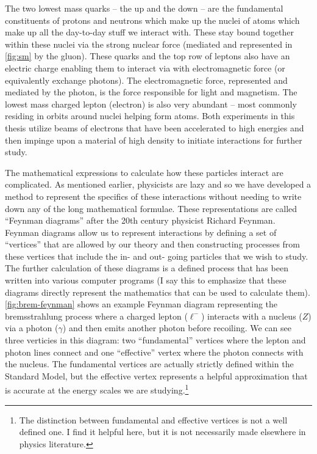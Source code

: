 The two lowest mass quarks -- the up and the down -- are the fundamental constituents of protons
and neutrons which make up the nuclei of atoms which make up all the day-to-day stuff we interact
with. These stay bound together within these nuclei via the strong nuclear force (mediated and
represented in \cref{fig:sm} by the gluon). These quarks and the top row of leptons also have an
electric charge enabling them to interact via with electromagnetic force (or equivalently exchange
photons). The electromagnetic force, represented and mediated by the photon, is the force
responsible for light and magnetism. The lowest mass charged lepton (electron) is also very
abundant -- most commonly residing in orbits around nuclei helping form atoms. Both experiments in
this thesis utilize beams of electrons that have been accelerated to high energies and then
impinge upon a material of high density to initiate interactions for further study.

The mathematical expressions to calculate how these particles interact are complicated. As
mentioned earlier, physicists are lazy and so we have developed a method to represent the specifics
of these interactions without needing to write down any of the long mathematical formulae. These
representations are called ``Feynman diagrams'' after the 20th century physicist Richard Feynman.
Feynman diagrams allow us to represent interactions by defining a set of ``vertices'' that are
allowed by our theory and then constructing processes from these vertices that include the in- and
out- going particles that we wish to study. The further calculation of these diagrams is a defined
process that has been written into various computer programs (I say this to emphasize that these
diagrams directly represent the mathematics that can be used to calculate them).
\cref{fig:brem-feynman} shows an example Feynman diagram representing the bremsstrahlung process
where a charged lepton (\(\ell^-\)) interacts with a nucleus (\(Z\)) via a photon (\(\gamma\)) and
then emits another photon before recoiling. We can see three verticies in this diagram: two
``fundamental'' vertices where the lepton and photon lines connect and one ``effective'' vertex
where the photon connects with the nucleus. The fundamental vertices are actually strictly defined
within the Standard Model, but the effective vertex represents a helpful approximation that is
accurate at the energy scales we are studying.\footnote{ The distinction between fundamental and
  effective vertices is not a well defined one. I find it helpful here, but it is not necessarily
  made elsewhere in physics literature. }

